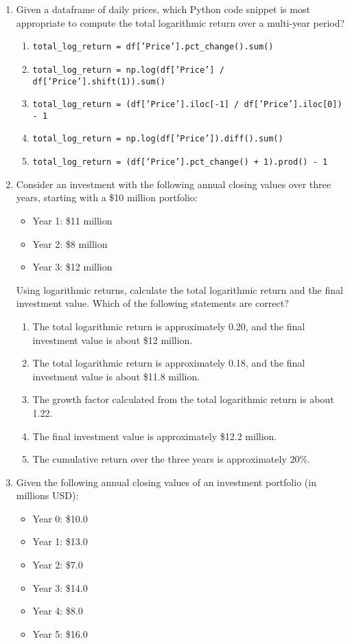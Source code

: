 \documentclass{article}
\begin{document}
\begin{enumerate}
    \item Given a dataframe of daily prices, which Python code snippet is most appropriate to compute the total logarithmic return over a multi-year period?
    \begin{enumerate}
        \item \texttt{total\_log\_return = df['Price'].pct\_change().sum()}
        \item \texttt{total\_log\_return = np.log(df['Price'] / df['Price'].shift(1)).sum()}
        \item \texttt{total\_log\_return = (df['Price'].iloc[-1] / df['Price'].iloc[0]) - 1}
        \item \texttt{total\_log\_return = np.log(df['Price']).diff().sum()}
        \item \texttt{total\_log\_return = (df['Price'].pct\_change() + 1).prod() - 1}
    \end{enumerate}

    \item Consider an investment with the following annual closing values over three years, starting with a \$10 million portfolio:
    \begin{itemize}
        \item Year 1: \$11 million
        \item Year 2: \$8 million
        \item Year 3: \$12 million
    \end{itemize}
    Using logarithmic returns, calculate the total logarithmic return and the final investment value. Which of the following statements are correct?
    \begin{enumerate}
        \item The total logarithmic return is approximately 0.20, and the final investment value is about \$12 million.
        \item The total logarithmic return is approximately 0.18, and the final investment value is about \$11.8 million.
        \item The growth factor calculated from the total logarithmic return is about 1.22.
        \item The final investment value is approximately \$12.2 million.
        \item The cumulative return over the three years is approximately 20\%.
    \end{enumerate}

    \item Given the following annual closing values of an investment portfolio (in millions USD):
    \begin{itemize}
        \item Year 0: \$10.0
        \item Year 1: \$13.0
        \item Year 2: \$7.0
        \item Year 3: \$14.0
        \item Year 4: \$8.0
        \item Year 5: \$16.0
    \end{itemize}


\end{enumerate}
\end{document}
